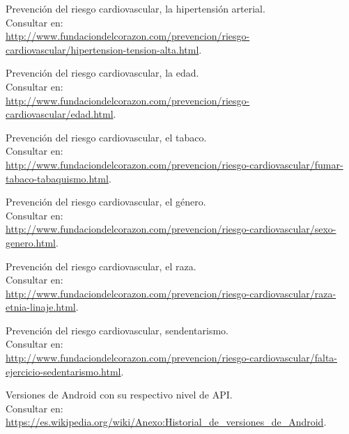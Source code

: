 \documentclass[11pt,spanish,
		listoftables,listoffigures]
		{tfgplantilla}
\begin{document}
\begin{thebibliography}{10}
   Prevención del riesgo cardiovascular, la hipertensión arterial.\\
   \newblock Consultar en:\\
   \url{ http://www.fundaciondelcorazon.com/prevencion/riesgo-cardiovascular/hipertension-tension-alta.html}.

   Prevención del riesgo cardiovascular, la edad.\\
   \newblock Consultar en:\\
   \url{ http://www.fundaciondelcorazon.com/prevencion/riesgo-cardiovascular/edad.html}.

   Prevención del riesgo cardiovascular, el tabaco.\\
   \newblock Consultar en:\\
   \url{ http://www.fundaciondelcorazon.com/prevencion/riesgo-cardiovascular/fumar-tabaco-tabaquismo.html}.

   Prevención del riesgo cardiovascular, el género.\\
   \newblock Consultar en:\\
   \url{ http://www.fundaciondelcorazon.com/prevencion/riesgo-cardiovascular/sexo-genero.html}.

   Prevención del riesgo cardiovascular, el raza.\\
   \newblock Consultar en:\\
   \url{ http://www.fundaciondelcorazon.com/prevencion/riesgo-cardiovascular/raza-etnia-linaje.html}.

   Prevención del riesgo cardiovascular, sendentarismo.\\
   \newblock Consultar en:\\
   \url{ http://www.fundaciondelcorazon.com/prevencion/riesgo-cardiovascular/falta-ejercicio-sedentarismo.html}.

  Versiones de Android con su respectivo nivel de API.\\
   \newblock Consultar en:\\
   \url{ https://es.wikipedia.org/wiki/Anexo:Historial_de_versiones_de_Android}.

\end{thebibliography}

\cleardoublepage
\end{document}
